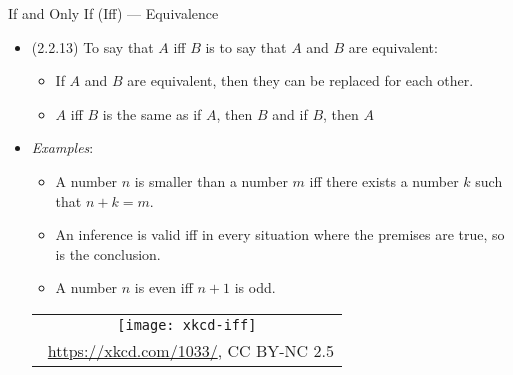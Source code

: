 \documentclass[../slides.tex]{subfiles}
\begin{document}
\begin{frame}{If and Only If (Iff) --- Equivalence}

\begin{itemize}

	\item (2.2.13) To say that $A$ iff $B$ is to say that $A$ and $B$ are equivalent:
	
	\begin{itemize}
	
		\item If $A$ and $B$ are equivalent, then they can be replaced for each other.
		
		\item $A$ iff $B$ is the same as if $A$, then $B$ and if $B$, then $A$
	
	\end{itemize}
	
	\item \emph{Examples}:
	
	\begin{itemize}
	
		\item A number $n$ is smaller than a number $m$ iff there exists a number $k$ such that $n+k=m$.
		
		\item An inference is valid iff in every situation where the premises are true, so is the conclusion.
		
		\item A number $n$ is even iff $n+1$ is odd.
	
	\end{itemize}
	
		\begin{center}
		\begin{tabular}{c}
		\texttt{[image: xkcd-iff]}\\[-1ex]
		{\tiny \textcopyright~\url{https://xkcd.com/1033/}, CC BY-NC 2.5}
		\end{tabular}
		\end{center}

\end{itemize}

\end{frame}
\end{document}
